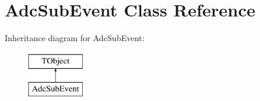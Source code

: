 \hypertarget{class_adc_sub_event}{}\section{Adc\+Sub\+Event Class Reference}
\label{class_adc_sub_event}
Inheritance diagram for Adc\+Sub\+Event\+:\begin{figure}[H]
\begin{center}
\leavevmode
\includegraphics[height=2.000000cm]{class_adc_sub_event}
\end{center}
\end{figure}
